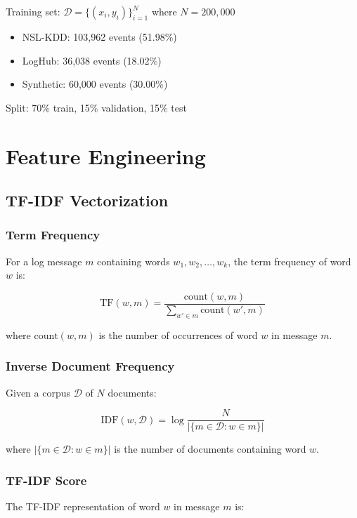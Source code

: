 \documentclass[12pt,a4paper]{article}
\begin{document}
Training set: $\mathcal{D} = \{(x_i, y_i)\}_{i=1}^{N}$ where $N = 200{,}000$

\begin{itemize}
    \item NSL-KDD: 103,962 events (51.98\%)
    \item LogHub: 36,038 events (18.02\%)
    \item Synthetic: 60,000 events (30.00\%)
\end{itemize}

Split: 70\% train, 15\% validation, 15\% test

\section{Feature Engineering}

\subsection{TF-IDF Vectorization}

\subsubsection{Term Frequency}

For a log message $m$ containing words $w_1, w_2, \ldots, w_k$, the term frequency of word $w$ is:

$$\text{TF}(w, m) = \frac{\text{count}(w, m)}{\sum_{w' \in m} \text{count}(w', m)}$$

where $\text{count}(w, m)$ is the number of occurrences of word $w$ in message $m$.

\subsubsection{Inverse Document Frequency}

Given a corpus $\mathcal{D}$ of $N$ documents:

$$\text{IDF}(w, \mathcal{D}) = \log \frac{N}{|\{m \in \mathcal{D} : w \in m\}|}$$

where $|\{m \in \mathcal{D} : w \in m\}|$ is the number of documents containing word $w$.

\subsubsection{TF-IDF Score}

The TF-IDF representation of word $w$ in message $m$ is:
\end{document}
